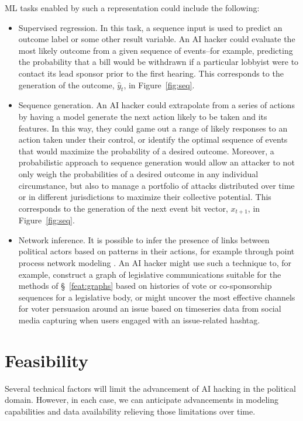 \documentclass[nonacm,12pt]{acmart}
\begin{document}
ML tasks enabled by such a representation could include the following:

\begin{itemize}
\item Supervised regression.  In this task, a sequence input is used to predict an outcome label or some other result variable.  
An AI hacker could evaluate the most likely outcome from a given sequence of events--for example, predicting the probability that a bill would be withdrawn if a particular lobbyist were to contact its lead sponsor prior to the first hearing. 
This corresponds to the generation of the outcome, $\hat{y}_t$, in Figure~\ref{fig:seq}.
\item Sequence generation.  An AI hacker could extrapolate from a series of actions by having a model generate the next action likely to be taken and its features.  
In this way, they could game out a range of likely responses to an action taken under their control, or identify the optimal sequence of events that would maximize the probability of a desired outcome. 
Moreover, a probabilistic approach to sequence generation would allow an attacker to not only weigh the probabilities of a desired outcome in any individual circumstance, but also to manage a portfolio of attacks distributed over time or in different jurisdictions to maximize their collective potential.
This corresponds to the generation of the next event bit vector, $x_{t+1}$, in Figure~\ref{fig:seq}.
\item Network inference. It is possible to infer the presence of links between political actors based on patterns in their actions, for example through point process network modeling \cite{linderman_scalable_2015,fox_contagion_2021}.  An AI hacker might use such a technique to, for example, construct a graph of legislative communications suitable for the methods of \S~\ref{feat:graphs} based on histories of vote or co-sponsorship sequences for a legislative body, or might uncover the most effective channels for voter persuasion around an issue based on timeseries data from social media capturing when users engaged with an issue-related hashtag.
\end{itemize}



\section{Feasibility}

Several technical factors will limit the advancement of AI hacking in the political domain.  However, in each case, we can anticipate advancements in modeling capabilities and data availability relieving those limitations over time.
\end{document}
